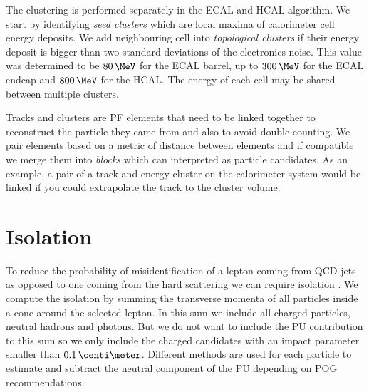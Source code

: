 The clustering is performed separately in the \gls{ECAL} and \gls{HCAL} algorithm. We start by identifying \textit{seed clusters} which are local maxima of calorimeter cell energy deposits. We add neighbouring cell into \textit{topological clusters} if their energy deposit is bigger than two standard deviations of the electronics noise. This value was determined to be $80\,\MeV$ for the \gls{ECAL} barrel, up to $300\,\MeV$ for the \gls{ECAL} endcap and $800\,\MeV$ for the \gls{HCAL}. The energy of each cell may be shared between multiple clusters.

Tracks and clusters are \gls{PF} elements that need to be linked together to reconstruct the particle they came from and also to avoid double counting. We pair elements based on a metric of distance between elements and if compatible we merge them into \textit{blocks} which can interpreted as particle candidates. As an example, a pair of a track and energy cluster on the calorimeter system would be linked if you could extrapolate the track to the cluster volume.


\section{Isolation}
\label{SUBSECTION:EventReconstructionAndSimulation_ParticleFlow_LeptonIsolation}


To reduce the probability of misidentification of a lepton coming from \gls{QCD} jets as opposed to one coming from the hard scattering we can require isolation \cite{ARTICLE:CMSElectronReconstruction8TeV, ARTICLE:CMSMuonReconstruction7TeV}. We compute the isolation by summing the transverse momenta of all particles inside a cone around the selected lepton. In this sum we include all charged particles, neutral hadrons and photons. But we do not want to include the \gls{PU} contribution to this sum so we only include the charged candidates with an impact parameter smaller than $0.1 \,\centi\meter$. Different methods are used for each particle to estimate and subtract the neutral component of the \gls{PU} depending on \gls{POG} recommendations.

